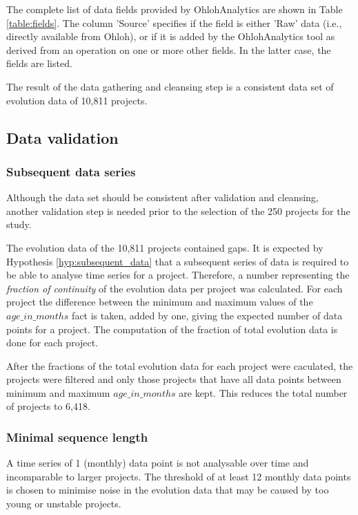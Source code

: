 The complete list of data fields provided by OhlohAnalytics are shown in Table
\ref{table:fields}. The column 'Source' specifies if the field is either 'Raw'
data (i.e., directly available from Ohloh), or if it is added by the
OhlohAnalytics tool as derived from an operation on one or more other fields.
In the latter case, the fields are listed.

The result of the data gathering and cleansing step is a consistent data set of
evolution data of 10,811 projects.



\subsection{Data validation}
\subsubsection{Subsequent data series}
Although the data set should be consistent after validation and cleansing,
another validation step is needed prior to the selection of the 250 projects
for the study.

The evolution data of the 10,811 projects contained gaps. It is expected by
Hypothesis \ref{hyp:subsequent_data} that a subsequent series of data is
required to be able to analyse time series for a project. Therefore, a number
representing the \emph{fraction of continuity }\rm of the evolution data per
project was calculated. For each project the difference between the minimum and
maximum values of the $age\_in\_months$ fact is taken, added by one, giving the
expected number of data points for a project. The computation of the fraction
of total evolution data is done for each project.

After the fractions of the total evolution data for each project were caculated,
the projects were filtered and only those projects that have all data points
between minimum and maximum $age\_in\_months$ are kept. This reduces the total
number of projects to 6,418.

\subsubsection{Minimal sequence length}
A time series of 1 (monthly) data point is not analysable over time and
incomparable to larger projects. The threshold of at least 12 monthly data
points is chosen to minimise noise in the evolution data that may be caused by
too young or unstable projects.


